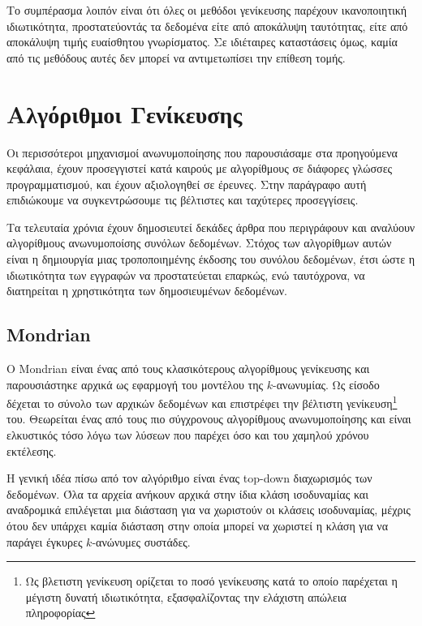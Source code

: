 Το συμπέρασμα λοιπόν είναι ότι όλες οι μεθόδοι γενίκευσης παρέχουν ικανοποιητική ιδιωτικότητα, προστατεύοντάς τα δεδομένα είτε από αποκάλυψη ταυτότητας, είτε από αποκάλυψη τιμής ευαίσθητου γνωρίσματος. Σε ιδιέταιρες καταστάσεις όμως, καμία από τις μεθόδους αυτές δεν μπορεί να αντιμετωπίσει την επίθεση τομής.





\clearpage
\section{Αλγόριθμοι Γενίκευσης}

Οι περισσότεροι μηχανισμοί ανωνυμοποίησης που παρουσιάσαμε στα προηγούμενα κεφάλαια, έχουν προσεγγιστεί κατά καιρούς με αλγορίθμους σε διάφορες γλώσσες προγραμματισμού, και έχουν αξιολογηθεί σε έρευνες. Στην παράγραφο αυτή επιδιώκουμε να συγκεντρώσουμε τις βέλτιστες και ταχύτερες προσεγγίσεις.

Τα τελευταία χρόνια έχουν δημοσιευτεί δεκάδες άρθρα που περιγράφουν και αναλύουν αλγορίθμους ανωνυμοποίσης συνόλων δεδομένων. 
Στόχος των αλγορίθμων αυτών είναι η δημιουργία μιας τροποποιημένης έκδοσης του συνόλου δεδομένων, έτσι ώστε η ιδιωτικότητα των εγγραφών να προστατεύεται επαρκώς, ενώ ταυτόχρονα, να διατηρείται η χρηστικότητα των δημοσιευμένων δεδομένων.



\subsection{\textlatin{Mondrian}}

Ο \textlatin{Mondrian} είναι ένας από τους κλασικότερους αλγορίθμους γενίκευσης και παρουσιάστηκε αρχικά ως εφαρμογή του μοντέλου της $k$-ανωνυμίας. Ως είσοδο δέχεται το σύνολο των αρχικών δεδομένων και επιστρέφει την βέλτιστη γενίκευση\footnote{Ως βλετιστη γενίκευση ορίζεται το ποσό γενίκευσης κατά το οποίο παρέχεται η μέγιστη δυνατή ιδιωτικότητα, εξασφαλίζοντας την ελάχιστη απώλεια πληροφορίας} του. 
Θεωρείται ένας από τους πιο σύγχρονους αλγορίθμους ανωνυμοποίησης και είναι ελκυστικός τόσο λόγω των λύσεων που παρέχει όσο και του χαμηλού χρόνου εκτέλεσης.

Η γενική ιδέα πίσω από τον αλγόριθμο είναι ένας \textlatin{top-down} διαχωρισμός των δεδομένων. Όλα τα αρχεία ανήκουν αρχικά στην ίδια κλάση ισοδυναμίας και αναδρομικά επιλέγεται μια διάσταση για να χωριστούν οι κλάσεις ισοδυναμίας, μέχρις ότου δεν υπάρχει καμία διάσταση στην οποία μπορεί να χωριστεί η κλάση για να παράγει έγκυρες $k$-ανώνυμες συστάδες. 

